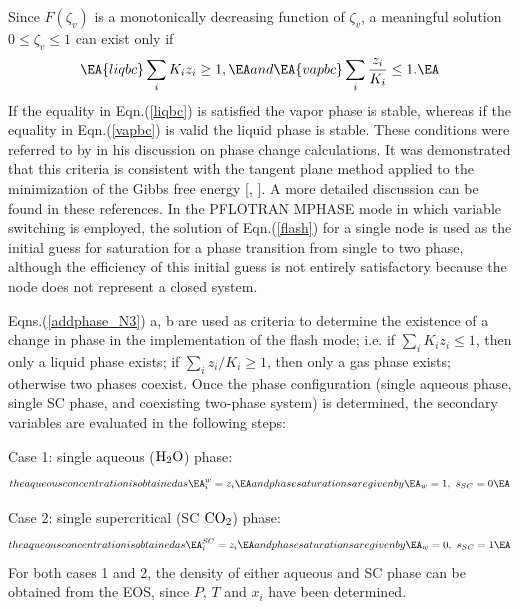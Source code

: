 \documentclass[12pt]{article}
\def\BA#1\EA{\begin{align}#1\end{align}}
\renewcommand{\c}{{\rm CO_2}}
\newcommand{\w}{{\rm H_2O}}
\begin{document}
Since $F(\zeta_v)$ is a monotonically decreasing function of $\zeta_v$, a meaningful solution $0\leq\zeta_v\leq1$ can exist only if 
\begin{subequations}\label{addphase_N3}
\BA\label{liqbc}
\sum_i K_i z_i \geq 1,
\EA
and
\BA\label{vapbc}
\sum_i \frac{z_i}{K_i} \leq 1.
\EA
\end{subequations}
If the equality in Eqn.(\ref{liqbc}) is satisfied the vapor phase is stable, whereas if the equality in Eqn.(\ref{vapbc}) is valid the liquid phase is stable. 
These conditions were referred to by \cite{michelsen-2-1982} in his discussion on phase change calculations. 
It was demonstrated that this criteria is consistent with the tangent plane method applied to the minimization of the Gibbs free energy [\cite{michelsen-1-1982}, \cite{nghiem-1985}]. A more detailed discussion can be found in these references. In the PFLOTRAN MPHASE mode in which variable switching is employed, the solution of Eqn.(\ref{flash}) for a single node is used as the initial guess for saturation for a phase transition from single to two phase, although the efficiency of this initial guess is not entirely satisfactory because the node does not represent a closed system.

Eqns.(\ref{addphase_N3}) a, b are used as criteria to determine the existence of a change in phase in the implementation of the flash mode; i.e. if $\sum_i K_i z_i \leq 1$, then only a liquid phase exists; if $\sum_i {z_i}/{K_i} \geq 1$, then only a gas phase exists; otherwise two phases coexist. Once the phase configuration (single aqueous phase, single SC phase, and coexisting two-phase system) is determined, the secondary variables are evaluated in the following steps: 

\noindent
Case 1: single aqueous ($\w$) phase:
\begin{subequations}\label{fla-sec-c1}
the aqueous concentration is obtained as
\BA
x_i^w = z_i
\EA
and phase saturations are given by
\BA
s_w = 1, \ s_{SC} =0 
\EA
\end{subequations}

\noindent
Case 2: single supercritical (SC $\c$) phase:
\begin{subequations}\label{fla-sec-c2}
the aqueous concentration is obtained as
\BA
x_i^{SC} = z_i
\EA
and phase saturations are given by
\BA
 s_w = 0, \ s_{SC} =1 
\EA
\end{subequations}
For both cases 1 and 2, the density of either aqueous and SC phase can be obtained from the EOS, since $P$, $T$ and $x_i$ have been determined.
\end{document}
